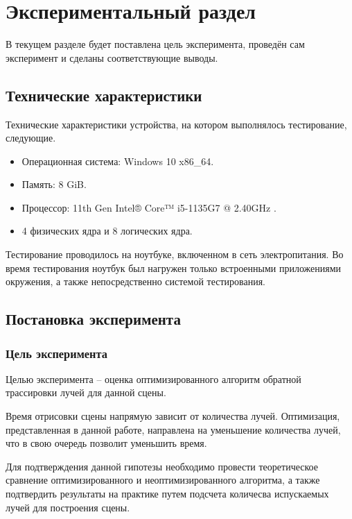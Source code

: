 \chapter{Экспериментальный раздел}
В текущем разделе будет поставлена цель эксперимента, проведён сам эксперимент и сделаны соответствующие выводы. 

\section{Технические характеристики}

Технические характеристики устройства, на котором выполнялось тестирование, следующие.

\begin{itemize}
	\item Операционная система: Windows 10 \cite{oswind} x86\_64.
	\item Память: 8 GiB.
	\item Процессор: 11th Gen Intel® Core™ i5-1135G7 @ 2.40GHz \cite{intel}.
	\item 4 физических ядра и 8 логических ядра.
\end{itemize}

Тестирование проводилось на ноутбуке, включенном в сеть электропитания. Во время тестирования ноутбук был нагружен только встроенными приложениями окружения, а также непосредственно системой тестирования.


\section{Постановка эксперимента} 

\subsection{Цель эксперимента}
Целью эксперимента -- оценка оптимизированного алгоритм обратной трассировки лучей для данной сцены. 

Время отрисовки сцены напрямую зависит от количества лучей. Оптимизация, представленная в данной работе, направлена на уменьшение количества лучей, что в свою очередь позволит уменьшить время. 

Для подтверждения данной гипотезы необходимо провести теоретическое сравнение оптимизированного и неоптимизированного алгоритма, а также подтвердить результаты на практике путем подсчета количесва испускаемых лучей для построения сцены.

